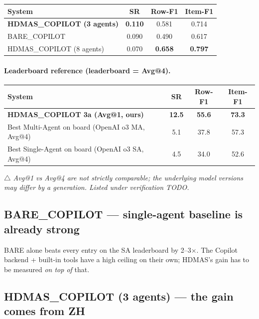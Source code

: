 \documentclass[11pt]{article}
\begin{document}
\begin{center}
\begin{tabular}{lccc}
\toprule
System & SR & Row-F1 & Item-F1 \\
\midrule
\textbf{HDMAS\_COPILOT (3 agents)} & \textbf{0.110} & 0.581          & 0.714 \\
BARE\_COPILOT                       & 0.090          & 0.490          & 0.617 \\
HDMAS\_COPILOT (8 agents)           & 0.070          & \textbf{0.658} & \textbf{0.797} \\
\bottomrule
\end{tabular}
\end{center}

\paragraph{Leaderboard reference (leaderboard = Avg@4).}

\begin{center}
\begin{tabular}{lccc}
\toprule
System & SR & Row-F1 & Item-F1 \\
\midrule
\textbf{HDMAS\_COPILOT 3a (Avg@1, ours)}              & \textbf{12.5} & \textbf{55.6} & \textbf{73.3} \\
Best Multi-Agent on board (OpenAI o3 MA, Avg@4)        & 5.1           & 37.8          & 57.3 \\
Best Single-Agent on board (OpenAI o3 SA, Avg@4)       & 4.5           & 34.0          & 52.6 \\
\bottomrule
\end{tabular}
\end{center}

\noindent\textit{$\triangle$ Avg@1 vs Avg@4 are not strictly comparable; the underlying model versions may differ by a generation. Listed under verification TODO.}

\subsection{BARE\_COPILOT --- single-agent baseline is already strong}

BARE alone beats every entry on the SA leaderboard by 2--3$\times$. The Copilot backend + built-in tools have a high ceiling on their own; HDMAS's gain has to be measured \emph{on top of} that.

\subsection{HDMAS\_COPILOT (3 agents) --- the gain comes from ZH}
\end{document}
